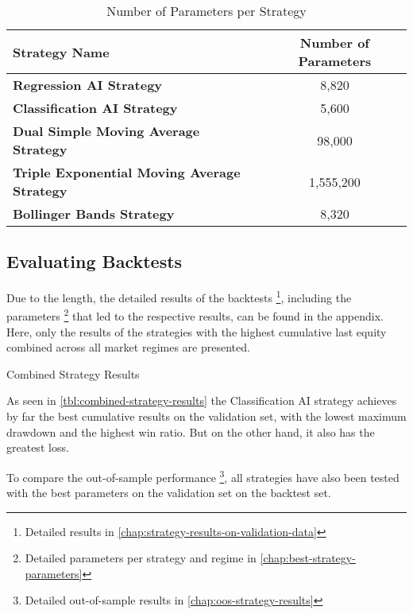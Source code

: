 \begin{table}[H]
    \centering
    \begin{tabular}{L{8cm}c}
        \toprule
        \textbf{Strategy Name} & Number of Parameters
        \\
        \midrule
        \textbf{Regression AI Strategy}                     & 8,820     \\
        \textbf{Classification AI Strategy}                 & 5,600     \\
        \textbf{Dual Simple Moving Average Strategy}        & 98,000    \\
        \textbf{Triple Exponential Moving Average Strategy} & 1,555,200 \\
        \textbf{Bollinger Bands Strategy}                   & 8,320     \\
        \bottomrule
    \end{tabular}
    \caption{Number of Parameters per Strategy}
    \label{tbl:parameters-number}
\end{table}

\subsection{Evaluating Backtests}

Due to the length, the detailed results of the backtests \footnote{Detailed results in \autoref{chap:strategy-results-on-validation-data}}, including the parameters \footnote{Detailed parameters per strategy and regime in \autoref{chap:best-strategy-parameters}} that led to the respective results, can be found in the appendix.
Here, only the results of the strategies with the highest cumulative last equity combined across all market regimes are presented.

\begin{table}[H]
    
    \caption{Combined Strategy Results}
    \label{tbl:combined-strategy-results}
\end{table}

\noindent
As seen in \autoref{tbl:combined-strategy-results} the Classification AI strategy achieves by far the best cumulative results on the validation set, with the lowest maximum drawdown and the highest win ratio.
But on the other hand, it also has the greatest loss.

To compare the out-of-sample performance \footnote{Detailed out-of-sample results in \autoref{chap:oos-strategy-results}}, all strategies have also been tested with the best parameters on the validation set on the backtest set.

